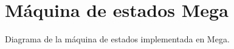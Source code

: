 
\chapter{Máquina de estados Mega} %

\label{app:megadiag} %

Diagrama de la máquina de estados implementada en Mega.

\newpage


